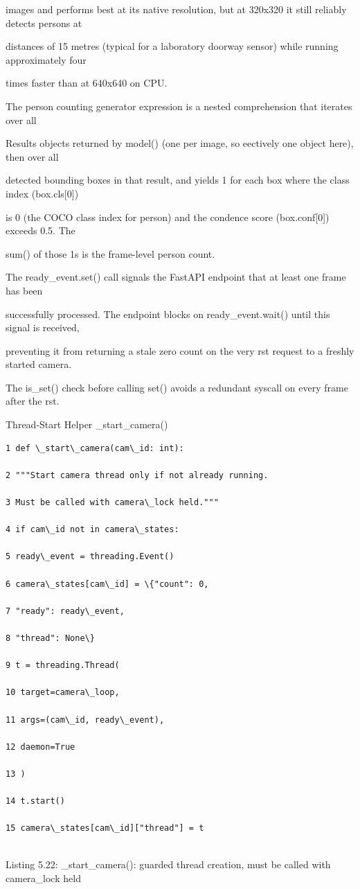 images and performs best at its native resolution, but at 320x320 it still reliably detects persons at

distances of 15 metres (typical for a laboratory doorway sensor) while running approximately four

times faster than at 640x640 on CPU.

The person counting generator expression is a nested comprehension that iterates over all

Results objects returned by model() (one per image, so eectively one object here), then over all

detected bounding boxes in that result, and yields 1 for each box where the class index (box.cls[0])

is 0 (the COCO class index for person) and the condence score (box.conf[0]) exceeds 0.5. The

sum() of those 1s is the frame-level person count.

The ready\_event.set() call signals the FastAPI endpoint that at least one frame has been

successfully processed. The endpoint blocks on ready\_event.wait() until this signal is received,

preventing it from returning a stale zero count on the very rst request to a freshly started camera.

The is\_set() check before calling set() avoids a redundant syscall on every frame after the rst.

Thread-Start Helper  \_start\_camera()

\begin{listingbox}
	\begin{verbatim}
1 def \_start\_camera(cam\_id: int):

2 """Start camera thread only if not already running.

3 Must be called with camera\_lock held."""

4 if cam\_id not in camera\_states:

5 ready\_event = threading.Event()

6 camera\_states[cam\_id] = \{"count": 0,

7 "ready": ready\_event,

8 "thread": None\}

9 t = threading.Thread(

10 target=camera\_loop,

11 args=(cam\_id, ready\_event),

12 daemon=True

13 )

14 t.start()

15 camera\_states[cam\_id]["thread"] = t


\end{verbatim}
\end{listingbox}
Listing 5.22: \_start\_camera(): guarded thread creation, must be called with camera\_lock held

